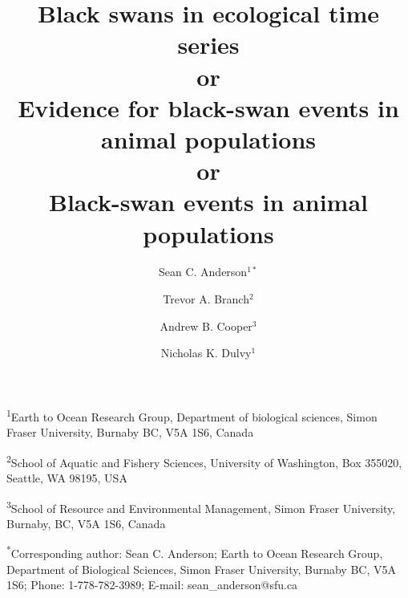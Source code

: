 \documentclass[12pt]{article}
\title{Black swans in ecological time series\\
or\\
Evidence for black-swan events in animal populations\\
or\\
Black-swan events in animal populations
}
\author{
Sean C. Anderson$^{1\ast}$ \and
Trevor A. Branch$^2$ \and
Andrew B. Cooper$^3$ \and
Nicholas K. Dulvy$^1$
}
\date{}
\begin{document}
\maketitle
\onehalfspacing


\noindent

\noindent
\textsuperscript{1}Earth to Ocean Research Group,
Department of biological sciences,
Simon Fraser University, Burnaby BC, V5A 1S6, Canada

\noindent
\textsuperscript{2}School of Aquatic and Fishery Sciences,
University of Washington, Box 355020, Seattle, WA 98195, USA

\noindent
\textsuperscript{3}School of Resource and Environmental Management,
Simon Fraser University, Burnaby, BC, V5A 1S6, Canada

\noindent
\textsuperscript{*}Corresponding author: Sean C. Anderson;
Earth to Ocean Research Group,
Department of Biological Sciences,
Simon Fraser University,
Burnaby BC, V5A 1S6;
Phone: 1-778-782-3989;
E-mail: sean\_anderson@sfu.ca

\thispagestyle{empty}

\linenumbers




\end{document}
